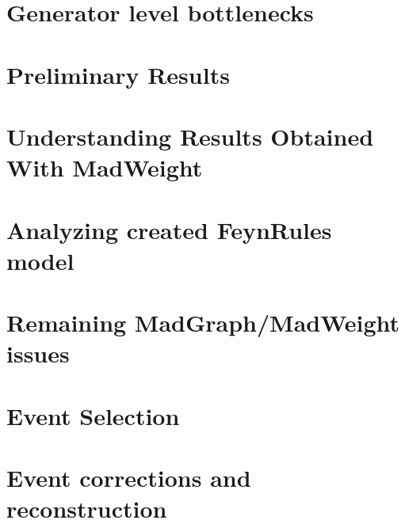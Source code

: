 \documentclass[a4paper,12pt]{report}
\begin{document}
\chapter{Generator level bottlenecks}


\chapter{Preliminary Results}
%

\chapter{Understanding Results Obtained With MadWeight}
%

\chapter{Analyzing created FeynRules model}
%

\chapter{Remaining MadGraph/MadWeight issues}


\chapter{Event Selection}
%

\chapter{Event corrections and reconstruction}
%
\end{document}
